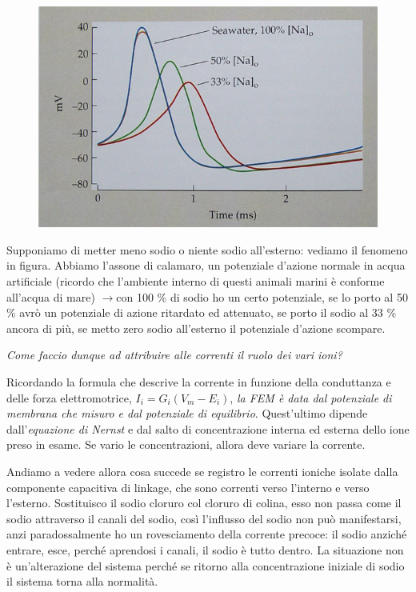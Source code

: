 \documentclass[a4paper,12pt]{article}
\newcommand{\lfreccia}{\ensuremath{\longrightarrow}}
\begin{document}
\begin{figure}[H]
\centering
\includegraphics[scale=0.4]{immagine/cor.jpg}
\end{figure}

Supponiamo di metter meno sodio o niente sodio all'esterno: vediamo il fenomeno in figura. Abbiamo l’assone di calamaro, un potenziale d’azione normale in acqua artificiale (ricordo che l’ambiente interno di questi animali marini è conforme all’acqua di mare) \lfreccia con 100 \% di sodio ho un certo potenziale, se lo porto al 50 \% avrò un potenziale di azione  ritardato ed attenuato, se porto il sodio al 33 \% ancora di più, se metto zero sodio all'esterno il potenziale d'azione scompare. 

\emph{Come faccio dunque ad attribuire alle correnti il ruolo dei vari ioni?}

Ricordando la formula che descrive la corrente in funzione della conduttanza e delle forza elettromotrice, $I_{i} = G_{i}  (V_{m} - E_{i})$, \emph{la FEM è data dal potenziale di membrana che misuro e dal potenziale di equilibrio}. Quest’ultimo dipende dall’\emph{equazione di Nernst} e dal salto di concentrazione interna ed esterna dello ione preso in esame. Se vario le concentrazioni, allora deve variare la corrente.

Andiamo a vedere allora cosa succede se registro le correnti ioniche isolate dalla componente capacitiva di linkage, che sono correnti verso l’interno e verso l’esterno. 
Sostituisco il sodio cloruro col cloruro di colina, esso non passa come il sodio attraverso il canali del sodio, così l'influsso del sodio non può manifestarsi, anzi paradossalmente ho un rovesciamento della corrente precoce: il sodio anziché entrare, esce, perché aprendosi i canali, il sodio è tutto dentro. La situazione non è un’alterazione del sistema perché se ritorno alla concentrazione iniziale di sodio il sistema torna alla normalità.
\end{document}
